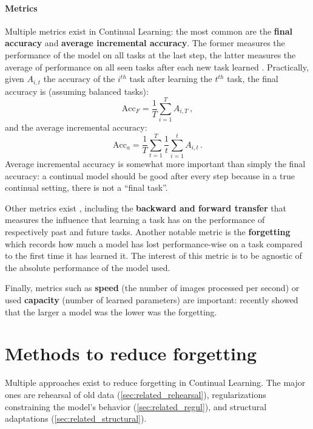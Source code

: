 \paragraph{Metrics} Multiple metrics exist in Continual Learning: the most common are the \textbf{final accuracy} and
\textbf{average incremental accuracy}. The former measures the performance of the model on all tasks
at the last step, the latter measures the average of performance on all seen tasks after each new
task learned \citep{rebuffi2017icarl}. Practically, given $A_{i,t}$ the accuracy of the $i^{th}$
task after
learning the $t^{th}$ task, the final accuracy is (assuming balanced tasks):
%
\begin{equation}
      \text{Acc}_F = \frac{1}{T} \sum_{i=1}^T A_{i,T}\,,
      \label{eq:related_final_acc}
\end{equation}
%
and the average incremental accuracy:
%
\begin{equation}
      \text{Acc}_a = \frac{1}{T} \sum_{t=1}^T \frac{1}{t}  \sum_{i=1}^t A_{i,t}\,.
      \label{eq:related_avg_acc}
\end{equation}
%
Average incremental accuracy is somewhat more important than simply the final accuracy: a continual
model should be good after every step because in a true continual setting, there is not a ``final
task''.

Other metrics exist \citep{diaz2018continualmetrics}, including the \textbf{backward and
      forward transfer} \citep{lopezpaz2017gem} that measures the influence that learning a task has on
the performance of respectively past and future tasks. Another notable metric is the
\textbf{forgetting} \citep{chaudhry2018riemannien_walk} which records how much a model has lost
performance-wise on a task compared to the first time it has learned it. The interest of this metric
is to be agnostic of the absolute performance of the model used.

Finally, metrics such as \textbf{speed} (\ie the number of images processed per second) or used
\textbf{capacity} (\ie number of learned parameters) are important:
\cite{ramasesh2022scalecontinual} recently showed that the larger a model was the lower was the
forgetting.

\section{Methods to reduce forgetting}
\label{sec:related_methods}

Multiple approaches exist to reduce forgetting in Continual Learning. The major ones are
rehearsal of old data (\autoref{sec:related_rehearsal}), regularizations constraining the model's
behavior (\autoref{sec:related_regul}), and structural adaptations (\autoref{sec:related_structural}).

